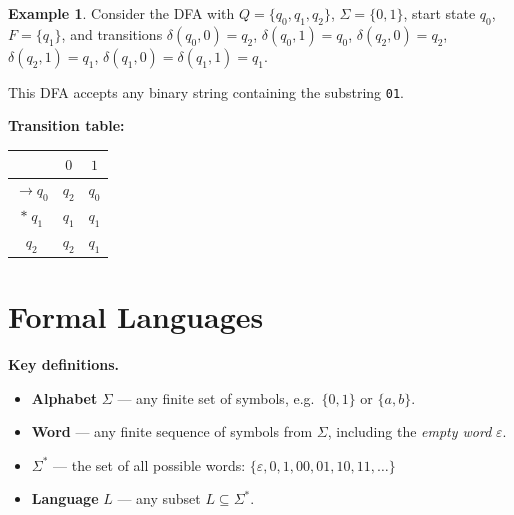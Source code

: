 \documentclass[11pt, a4paper]{article}
\newcommand{\startarrow}[1]{%
  \draw[-Stealth, semithick, gray!70!black]
    ([xshift=-0.8cm]#1.west) -- (#1.west);%
}
\theoremstyle{definition}
\newtheorem{example}{Example}[section]
\theoremstyle{remark}
\begin{document}
\begin{example}
Consider the DFA with $Q=\{q_0,q_1,q_2\}$, $\Sigma=\{0,1\}$, start state $q_0$,
$F=\{q_1\}$, and transitions $\delta(q_0,0)=q_2$, $\delta(q_0,1)=q_0$,
$\delta(q_2,0)=q_2$, $\delta(q_2,1)=q_1$, $\delta(q_1,0)=\delta(q_1,1)=q_1$.

This DFA accepts any binary string containing the substring \texttt{01}.

\bigskip
\begin{center}
\end{center}

\bigskip\textbf{Transition table:}

\begin{center}
\begin{tabular}{c|cc}
  \toprule
             & $0$   & $1$   \\
  \midrule
  $\to q_0$  & $q_2$ & $q_0$ \\
  $*\;q_1$   & $q_1$ & $q_1$ \\
  $q_2$      & $q_2$ & $q_1$ \\
  \bottomrule
\end{tabular}
\end{center}
\end{example}

\section{Formal Languages}

\begin{defbox}
\textbf{Key definitions.}
\begin{itemize}[itemsep=3pt]
  \item \textbf{Alphabet} $\Sigma$ --- any finite set of symbols, e.g.\ $\{0,1\}$ or
        $\{a,b\}$.
  \item \textbf{Word} --- any finite sequence of symbols from $\Sigma$, including the
        \emph{empty word} $\varepsilon$.
  \item $\Sigma^*$ --- the set of all possible words:
        $\{\varepsilon,0,1,00,01,10,11,\ldots\}$
  \item \textbf{Language} $L$ --- any subset $L\subseteq\Sigma^*$.
\end{itemize}
\end{defbox}
\end{document}

